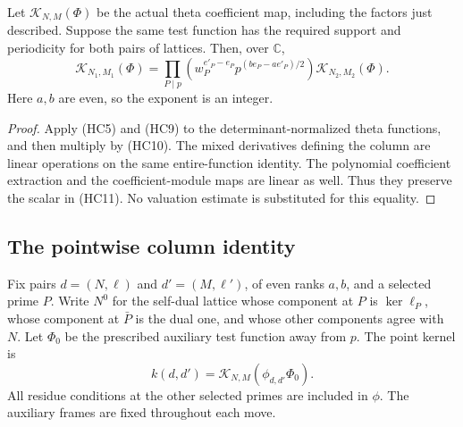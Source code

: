 \begin{proposition}\label{hec-kernel-move}
Let $\mathcal K_{N,M}(\Phi)$ be the actual theta coefficient map,
including the factors just described. Suppose the same test function
has the required support and periodicity for both pairs of lattices.
Then, over $\mathbb C$,
\[
 \mathcal K_{N_1,M_1}(\Phi)
   =\prod_{P\mid p}\left(w_P^{e'_P-e_P}
                    p^{(b e_P-a e'_P)/2}\right)
                                  \mathcal K_{N_2,M_2}(\Phi).
 \tag{HC11}
\]
Here $a,b$ are even, so the exponent is an integer.
\end{proposition}
\begin{proof}
Apply (HC5) and (HC9) to the determinant-normalized theta functions,
and then multiply by (HC10). The mixed derivatives defining the
column are linear operations on the same entire-function identity.
The polynomial coefficient extraction and the coefficient-module
maps are linear as well. Thus they preserve the scalar in (HC11).
No valuation estimate is substituted for this equality.
\end{proof}

\subsection{The pointwise column identity}

Fix pairs $d=(N,\ell)$ and $d'=(M,\ell')$, of even ranks $a,b$,
and a selected prime $P$. Write $N^0$ for the self-dual lattice
whose component at $P$ is $\ker\ell_P$, whose component at $\bar P$
is the dual one, and whose other components agree with $N$.
Let $\Phi_0$ be the prescribed auxiliary test function away from $p$.
The point kernel is
\[
          k(d,d')=\mathcal K_{N,M}(\phi_{d,d'}\Phi_0).
 \tag{HC12}
\]
All residue conditions at the other selected primes are included
in $\phi$. The auxiliary frames are fixed throughout each move.

